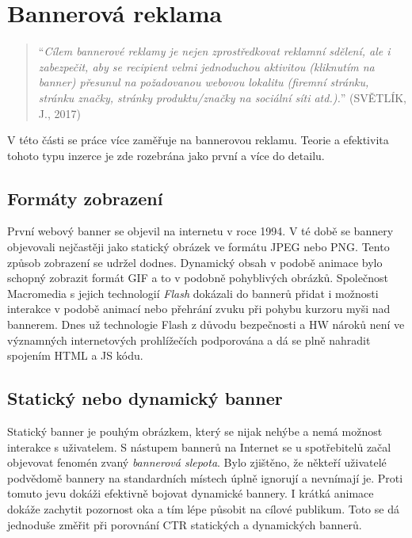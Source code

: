 \section{Bannerová reklama}
    \begin{quote}
        \enquote{\emph{Cílem bannerové reklamy je nejen zprostředkovat reklamní sdělení, ale i zabezpečit, aby se recipient velmi jednoduchou aktivitou
        (kliknutím na banner) přesunul na požadovanou webovou lokalitu (firemní stránku, stránku značky, stránky produktu/značky na sociální síti atd.).}}
        (SVĚTLÍK, J., 2017) \cite{svetlik:reklama}
    \end{quote}

    V této části se práce více zaměřuje na bannerovou reklamu.
    Teorie a efektivita tohoto typu inzerce je zde rozebrána jako první a více do detailu. \cite{banner:advertising}

    \subsection{Formáty zobrazení}
    První webový banner se objevil na internetu v roce 1994. V té době se bannery objevovali nejčastěji jako statický obrázek ve formátu
    JPEG nebo PNG. Tento způsob zobrazení se udržel dodnes. Dynamický obsah v podobě animace bylo schopný zobrazit formát GIF a to v podobně pohyblivých obrázků.
    Společnost Macromedia s jejich technologií \emph{Flash} dokázali do bannerů přidat i možnosti interakce v podobě animací nebo přehrání zvuku při
    pohybu kurzoru myši nad bannerem. Dnes už technologie Flash z důvodu bezpečnosti a HW nároků není ve významných internetových prohlížečích podporována a
    dá se plně nahradit spojením HTML a JS kódu. 

    \subsection{Statický nebo dynamický banner}
    Statický banner je pouhým obrázkem, který se nijak nehýbe a nemá možnost interakce s uživatelem. S nástupem bannerů na Internet se u
    spotřebitelů začal objevovat fenomén zvaný \emph{bannerová slepota}. Bylo zjištěno, že někteří uživatelé podvědomě bannery na standardních místech
    úplně ignorují a nevnímají je. Proti tomuto jevu dokáži efektivně bojovat dynamické bannery.
    I krátká animace dokáže zachytit pozornost oka a tím lépe působit na cílové publikum.
    Toto se dá jednoduše změřit při porovnání CTR statických a dynamických bannerů.

